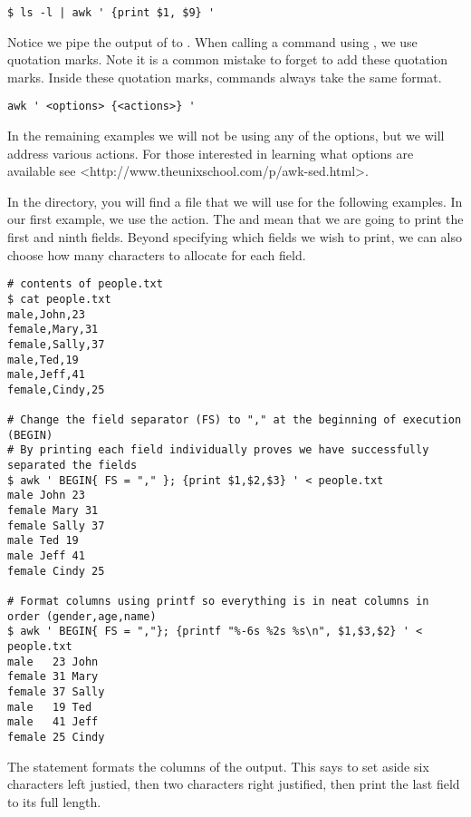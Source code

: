 \begin{lstlisting}
$ ls -l | awk ' {print $1, $9} '
\end{lstlisting}

Notice we pipe the output of  to .
When calling a command using , we use quotation marks.
Note it is a common mistake to forget to add these quotation marks.
Inside these quotation marks, commands always take the same format.

\begin{lstlisting}
awk ' <options> {<actions>} '
\end{lstlisting}

In the remaining examples we will not be using any of the options, but we will address various actions.
For those interested in learning what options are available see <http://www.theunixschool.com/p/awk-sed.html>.

In the  directory, you will find a  file that we will use for the following examples.
In our first example, we use the  action.
The  and  mean that we are going to print the first and ninth fields.
Beyond specifying which fields we wish to print, we can also choose how many characters to allocate for each field.


\begin{lstlisting}
# contents of people.txt
$ cat people.txt
male,John,23
female,Mary,31
female,Sally,37
male,Ted,19
male,Jeff,41
female,Cindy,25

# Change the field separator (FS) to "," at the beginning of execution (BEGIN)
# By printing each field individually proves we have successfully separated the fields
$ awk ' BEGIN{ FS = "," }; {print $1,$2,$3} ' < people.txt
male John 23
female Mary 31
female Sally 37
male Ted 19
male Jeff 41
female Cindy 25

# Format columns using printf so everything is in neat columns in order (gender,age,name)
$ awk ' BEGIN{ FS = ","}; {printf "%-6s %2s %s\n", $1,$3,$2} ' < people.txt
male   23 John
female 31 Mary
female 37 Sally
male   19 Ted
male   41 Jeff
female 25 Cindy
\end{lstlisting}

The statement  formats the columns of the output.
This says to set aside six characters left justied, then two characters right justified, then print the last field to its full length.

